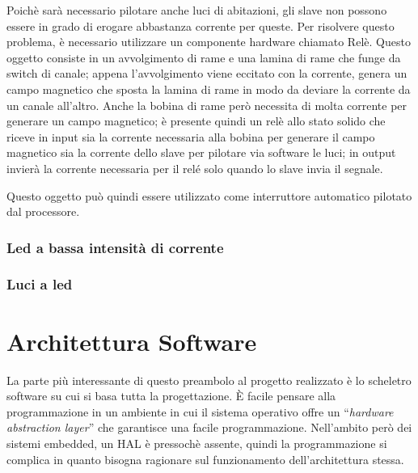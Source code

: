 \documentclass[a4paper,titlepage]{book}
\begin{document}
Poichè sarà necessario pilotare anche luci di abitazioni, gli slave non possono essere in grado di erogare abbastanza corrente per queste. Per risolvere questo problema, è necessario utilizzare un componente hardware chiamato Relè. Questo oggetto consiste in un avvolgimento di rame e una lamina di rame che funge da switch di canale; appena l'avvolgimento viene eccitato con la corrente, genera un campo magnetico che sposta la lamina di rame in modo da deviare la corrente da un canale all'altro. Anche la bobina di rame però necessita di molta corrente per generare un campo magnetico; è presente quindi un relè allo stato solido che riceve in input sia la corrente necessaria alla bobina per generare il campo magnetico sia la corrente dello slave per pilotare via software le luci; in output invierà la corrente necessaria per il relé solo quando lo slave invia il segnale.

Questo oggetto può quindi essere utilizzato come interruttore automatico pilotato dal processore.


\subsection{Led a bassa intensità di corrente}


\subsection{Luci a led}



\chapter{Architettura Software}

La parte più interessante di questo preambolo al progetto realizzato è lo scheletro software su cui si basa tutta la progettazione. È facile pensare alla programmazione in un ambiente in cui il sistema operativo offre un ``\textit{hardware abstraction layer}'' che garantisce una facile programmazione. Nell'ambito però dei sistemi embedded, un HAL è pressochè assente, quindi la programmazione si complica in quanto bisogna ragionare sul funzionamento dell'architettura stessa.
\end{document}
